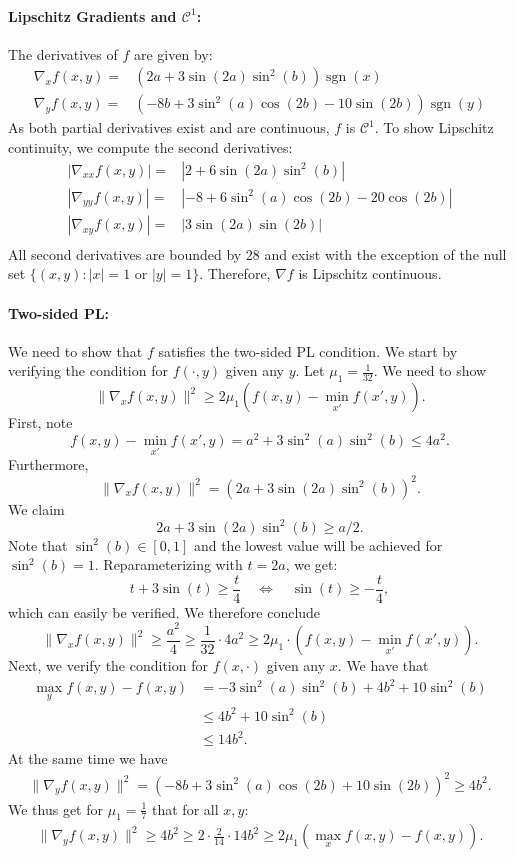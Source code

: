 \documentclass{article}
\DeclareMathOperator{\sgn}{sgn}
\begin{document}
\paragraph{Lipschitz Gradients and $\mathcal{C}^1$:} The derivatives of $f$ are given by:
\begin{align*}
    \nabla_x f(x,y) = & \left(2a + 3\sin(2a)\sin^2(b)\right) \sgn(x)\\
    \nabla_y f(x,y) = & \left(-8b + 3 \sin^2(a)\cos(2b) - 10\sin(2b)\right) \sgn(y)
\end{align*}
As both partial derivatives exist and are continuous, $f$ is $\mathcal{C}^1$. To show Lipschitz continuity, we compute the second derivatives:
\begin{align*}
    |\nabla_{xx} f(x,y)| = & \left|2 + 6\sin(2a)\sin^2(b)\right| \\ 
    |\nabla_{yy} f(x,y)| = & \left|-8 + 6\sin^2(a)\cos(2b) - 20\cos(2b)\right|\\
    |\nabla_{xy} f(x,y)| = & \left|3 \sin(2a)\sin(2b)\right|\\
\end{align*}
All second derivatives are bounded by $28$ and exist with the exception of the null set $\{(x,y): |x|=1 \text{ or } |y|=1\}$. Therefore, $\nabla f$ is Lipschitz continuous.

\paragraph{Two-sided PL:} We need to show that $f$ satisfies the two-sided PL condition. 
We start by verifying the condition for \( f(\cdot,y) \) given any \( y \).
Let \( \mu_1 = \frac{1}{32} \). 
We need to show
\[
\|\nabla_x f(x,y)\|^2 \geq 2 \mu_1 \left(f(x,y) - \min_{x'} f(x',y)\right).
\]
First, note
\[
f(x,y) - \min_{x'} f(x',y) = a^2 + 3 \sin^2(a)\sin^2(b) \leq 4a^2.
\]
Furthermore,
\[
\|\nabla_x f(x,y)\|^2 = \left(2a + 3\sin(2a)\sin^2(b)\right)^2.
\]
We claim
\[
2a + 3\sin(2a)\sin^2(b) \geq a/2.
\]
Note that \( \sin^2(b) \in [0,1] \) and the lowest value will be achieved for \( \sin^2(b) = 1 \). Reparameterizing with \( t = 2a \), we get:
\[
t + 3\sin(t) \geq \frac{t}{4} \quad \Longleftrightarrow \quad \sin(t) \geq -\frac{t}{4},
\]
which can easily be verified.
We therefore conclude
\[
\|\nabla_x f(x,y)\|^2 \geq \frac{a^2}{4} \geq \frac{1}{32}\cdot 4a^2 \geq 2\mu_1\cdot \left(f(x,y) - \min_{x'} f(x',y)\right).
\]
Next, we verify the condition for \( f(x,\cdot) \) given any \( x \). We have that
\begin{align*}
\max_y f(x,y) - f(x,y) &= -3\sin^2(a)\sin^2(b) + 4b^2 + 10\sin^2(b)\\
&\leq 4b^2 + 10\sin^2(b)\\
&\leq 14b^2.
\end{align*}
At the same time we have
\begin{align*}
\|\nabla_y f(x,y)\|^2 = \left(-8b + 3\sin^2(a)\cos(2b) + 10\sin(2b)\right)^2 \geq 4b^2.
\end{align*}
We thus get for $\mu_1 = \frac{1}{7}$ that for all $x,y$:
\begin{align*}
\|\nabla_y f(x,y)\|^2 \geq 4b^2 \geq 2 \cdot \frac{2}{14} \cdot 14b^2 \geq 2\mu_1\left(\max_x f(x,y) - f(x,y)\right).
\end{align*}
\end{document}
